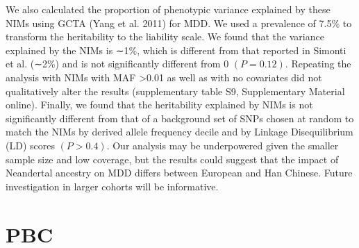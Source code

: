 We also calculated the proportion of phenotypic variance explained by these NIMs using GCTA (Yang et al. 2011) for MDD. We used a prevalence of 7.5\% to transform the heritability to the liability scale. We found that the variance explained by the NIMs is ∼1\%, which is different from that reported in Simonti et al. (∼2\%) and is not significantly different from 0 $(P=0.12)$. Repeating the analysis with NIMs with MAF >0.01 as well as with no covariates did not qualitatively alter the results (supplementary table S9, Supplementary Material online). Finally, we found that the heritability explained by NIMs is not significantly different from that of a background set of SNPs chosen at random to match the NIMs by derived allele frequency decile and by Linkage Disequilibrium (LD) scores $(P>0.4)$. Our analysis may be underpowered given the smaller sample size and low coverage, but the results could suggest that the impact of Neandertal ancestry on MDD differs between European and Han Chinese. Future investigation in larger cohorts will be informative.
\section{PBC}
